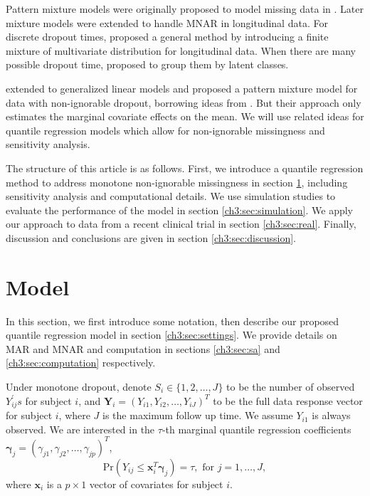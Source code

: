 \documentclass[useAMS,usenatbib,referee]{biom}
\newcommand{\prob}{\mbox{Pr}}
\begin{document}
Pattern mixture models were originally proposed to model missing data
in \citet{rubin1977}. Later mixture models were extended to handle
MNAR in longitudinal data. For discrete dropout times,
\citet{little1993, little1994} proposed a general method by
introducing a finite mixture of multivariate distribution for
longitudinal data. When there are many possible dropout time,
\citet{roy2003} proposed to group them by latent classes.

\citet{roy2008} extended \citet{roy2003} to generalized linear models
and proposed a pattern mixture model for data with non-ignorable
dropout, borrowing ideas from \citet{heagerty1999}.  But their
approach only estimates the marginal covariate effects on the mean. We
will use related ideas for quantile regression models which allow for
non-ignorable missingness and sensitivity analysis.

The structure of this article is as follows. First, we introduce a
quantile regression method to address monotone non-ignorable
missingness in section \ref{ch3:sec:model}, including sensitivity analysis
and computational details.  We use simulation studies to evaluate the
performance of the model in section \ref{ch3:sec:simulation}. We apply our
approach to data from a recent clinical trial in section
\ref{ch3:sec:real}. Finally, discussion and conclusions are given in
section \ref{ch3:sec:discussion}.

\section{Model}
\label{ch3:sec:model}

In this section, we first introduce some notation, then describe our proposed quantile regression model in section \ref{ch3:sec:settings}.
We provide details on MAR and MNAR and computation in sections \ref{ch3:sec:sa} and \ref{ch3:sec:computation} respectively.

Under monotone dropout, denote $S_i \in \{1, 2, \ldots, J\}$ to be the number of observed $Y_{ij}^{\prime} s$ for subject $i$,
and $\bm Y_i = (Y_{i1}, Y_{i2}, \ldots, Y_{iJ})^{T}$ to be the full data response vector for subject $i$, where $J$ is the maximum follow up time.
We assume $Y_{i1}$ is always observed.
We are interested in the $\tau$-th marginal quantile regression coefficients $\bm \gamma_j = (\gamma_{j1}, \gamma_{j2}, \ldots, \gamma_{jp})^T$,
\begin{equation}\label{eq:marg}
  \prob (Y_{ij} \leq \bm x_i^{T} \bm \gamma_j ) = \tau, \mbox{ for } j = 1, \ldots, J,
\end{equation}
where $\bm x_i$ is a $p \times 1$ vector of covariates for subject
$i$.
\end{document}
